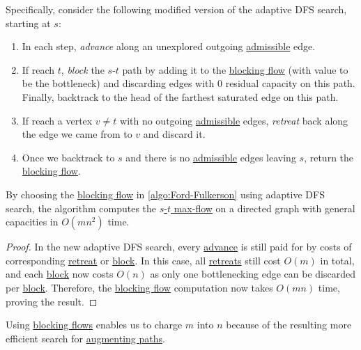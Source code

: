 Specifically, consider the following modified version of the adaptive DFS search, starting at \(s\):
\begin{enumerate}
	\item\label{algo:general-adaptive-DFS-advance} In each step, \emph{advance} along an unexplored outgoing \hyperref[def:admissible]{admissible} edge.
	\item\label{algo:general-adaptive-DFS-block} If reach \(t\), \emph{block} the \(s\)-\(t\) path by adding it to the \hyperref[def:blocking-flow]{blocking flow} (with value to be the bottleneck) and discarding edges with \(0\) residual capacity on this path. Finally, backtrack to the head of the farthest saturated edge on this path.
	\item\label{algo:general-adaptive-DFS-retreat} If reach a vertex \(v \neq t\) with no outgoing \hyperref[def:admissible]{admissible} edges, \emph{retreat} back along the edge we came from to \(v\) and discard it.
	\item Once we backtrack to \(s\) and there is no \hyperref[def:admissible]{admissible} edges leaving \(s\), return the \hyperref[def:blocking-flow]{blocking flow}.
\end{enumerate}

\begin{theorem}\label{thm:Ford-Fulkerson-blocking-flow-general}
	By choosing the \hyperref[def:blocking-flow]{blocking flow} in \autoref{algo:Ford-Fulkerson} using adaptive DFS search, the algorithm computes the \hyperref[prb:s-t-max-flow]{\(s\)-\(t\) max-flow} on a directed graph with general capacities in \(O(mn^2)\) time.
\end{theorem}
\begin{proof}
	In the new adaptive DFS search, every \hyperref[algo:unit-adaptive-DFS-advance]{advance} is still paid for by costs of corresponding \hyperref[algo:unit-adaptive-DFS-retreat]{retreat} or \hyperref[algo:unit-adaptive-DFS-block]{block}. In this case, all \hyperref[algo:general-adaptive-DFS-retreat]{retreats} still cost \(O(m)\) in total, and each \hyperref[algo:general-adaptive-DFS-block]{block} now costs \(O(n)\) as only one bottlenecking edge can be discarded per \hyperref[algo:general-adaptive-DFS-block]{block}. Therefore, the \hyperref[def:blocking-flow]{blocking flow} computation now takes \(O(mn)\) time, proving the result.
\end{proof}

\begin{intuition}
	Using \hyperref[def:blocking-flow]{blocking flows} enables us to charge \(m\) into \(n\) because of the resulting more efficient search for \hyperref[def:augmenting-path]{augmenting paths}.
\end{intuition}

